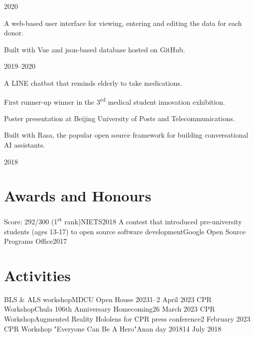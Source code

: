 \documentclass{cv}
\begin{document}
\begin{cv_table}
{  }{}{2020}
  {\begin{cv_itemize}
      \item A web-based user interface for viewing, entering and editing the data for each donor.
      \item Built with Vue and json-based database hosted on GitHub.
    \end{cv_itemize}
  }{}{2019--2020}
  {\begin{cv_itemize}
      \item A LINE chatbot that reminds elderly to take medications.
      \item First runner-up winner in the 3\textsuperscript{rd} medical student innovation exhibition.
      \item Poster presentation at Beijing University of Posts and Telecommunications.
      \item Built with Rasa, the popular open source framework for building conversational AI assistants.
    \end{cv_itemize}
  }{}{2018}
\end{cv_table}

\section{Awards and Honours}
\begin{cv_table}
  {Score: 292/300 (1\textsuperscript{st} rank)}{NIETS}{2018}
  {A contest that introduced pre-university students (ages 13-17) to open source software development}{Google Open Source Programs Office}{2017}
\end{cv_table}

\section{Activities}
\begin{cv_table}
  {BLS \& ALS workshop}{MDCU Open House 2023}{1--2 April 2023}
  {CPR Workshop}{Chula 106th Anniversary Homecoming}{26 March 2023}
  {CPR Workshop}{Augmented Reality Hololens for CPR press conference}{2 February 2023}
  {CPR Workshop "Everyone Can Be A Hero"}{Anan day 2018}{14 July 2018}
\end{cv_table}
\end{document}
